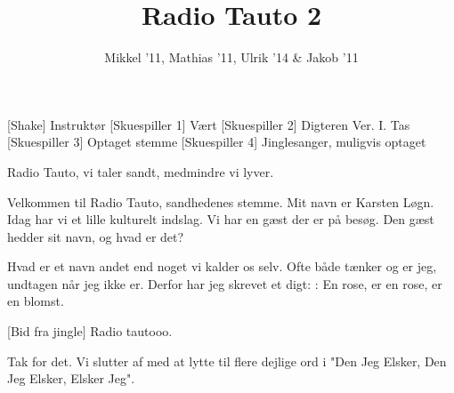 \documentclass[a4paper,11pt]{article}
\title{Radio Tauto 2}
\author{Mikkel '11, Mathias '11, Ulrik '14 \& Jakob '11}
\begin{document}
\maketitle

\begin{roles}
[Shake] Instruktør
[Skuespiller 1] Vært
[Skuespiller 2] Digteren Ver. I. Tas
[Skuespiller 3] Optaget stemme %
[Skuespiller 4] Jinglesanger, muligvis optaget
\end{roles}


\begin{sketch}



 Radio Tauto, vi taler sandt, medmindre vi lyver.

 Velkommen til Radio Tauto, sandhedenes stemme. Mit navn er Karsten Løgn. Idag har vi et lille kulturelt indslag. Vi har en gæst der er på besøg. Den gæst hedder sit navn, og hvad er det?

 Hvad er et navn andet end noget vi kalder os selv. Ofte både tænker og er jeg, undtagen når jeg ikke er. Derfor har jeg skrevet et digt: : En rose, er en rose, er en blomst.

[Bid fra jingle] Radio tautooo.

 Tak for det.  Vi slutter af med at lytte til flere dejlige ord i "Den Jeg Elsker, Den Jeg Elsker, Elsker Jeg".


\end{sketch}
\end{document}
